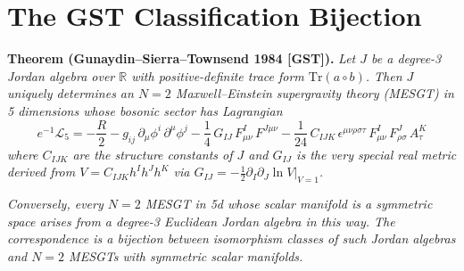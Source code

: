 %
%
%



\section{The GST Classification Bijection}

\textbf{Theorem (Gunaydin--Sierra--Townsend 1984 [GST]).}
\textit{Let $J$ be a degree-3 Jordan algebra over $\mathbb{R}$ with
positive-definite trace form $\mathrm{Tr}(a \circ b)$. Then $J$ uniquely
determines an $N=2$ Maxwell--Einstein supergravity theory (MESGT) in
5 dimensions whose bosonic sector has Lagrangian}
\begin{equation}\label{eq:53.8}
  e^{-1}\mathcal{L}_5 = -\frac{R}{2}
    - g_{ij}\,\partial_\mu\phi^i\,\partial^\mu\phi^j
    - \frac{1}{4}\,G_{IJ}\,F^I_{\mu\nu}\,F^{J\mu\nu}
    - \frac{1}{24}\,C_{IJK}\,\epsilon^{\mu\nu\rho\sigma\tau}\,
      F^I_{\mu\nu}\,F^J_{\rho\sigma}\,A^K_\tau
\end{equation}
\textit{where $C_{IJK}$ are the structure constants of $J$ and $G_{IJ}$ is
the very special real metric derived from $V = C_{IJK} h^I h^J h^K$ via
$G_{IJ} = -\frac{1}{2}\partial_I\partial_J \ln V|_{V=1}$.}

\textit{Conversely, every $N=2$ MESGT in 5d whose scalar manifold is a
symmetric space arises from a degree-3 Euclidean Jordan algebra in this way.
The correspondence is a bijection between isomorphism classes of such
Jordan algebras and $N=2$ MESGTs with symmetric scalar manifolds.}

